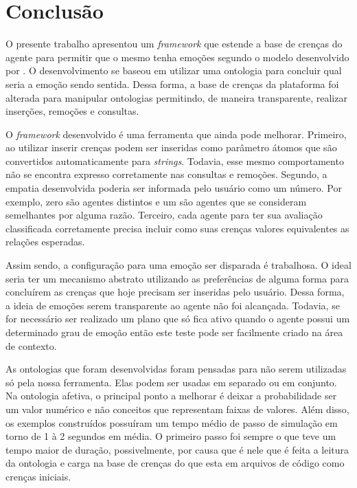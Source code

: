 \chapter{Conclusão} \label{ch:cf}

O presente trabalho apresentou um \emph{framework} que estende a base de
crenças do agente \jason para permitir que o mesmo tenha emoções segundo o
modelo desenvolvido por \citet{ortony1988cse}. O desenvolvimento se baseou em
utilizar uma ontologia para concluir qual seria a emoção sendo sentida. Dessa
forma, a base de crenças da plataforma foi alterada para manipular ontologias
permitindo, de maneira transparente, realizar inserções, remoções e consultas.

O \emph{framework} desenvolvido é uma ferramenta que ainda pode melhorar.
Primeiro, ao utilizar inserir crenças podem ser inseridas como parâmetro
átomos que são convertidos automaticamente para \emph{strings}. Todavia, esse
mesmo comportamento não se encontra expresso corretamente nas consultas e
remoções. Segundo, a empatia desenvolvida poderia ser informada pelo usuário
como um número. Por exemplo, zero são agentes distintos e um são agentes que
se consideram semelhantes por alguma razão. Terceiro, cada agente para ter sua
avaliação classificada corretamente precisa incluir como suas crenças valores
equivalentes as relações esperadas.

Assim sendo, a configuração para uma emoção ser disparada é trabalhosa. O
ideal seria ter um mecanismo abstrato utilizando as preferências de alguma
forma para concluírem as crenças que hoje precisam ser inseridas pelo usuário.
Dessa forma, a ideia de emoções serem transparente ao agente não foi
alcançada. Todavia, se for necessário ser realizado um plano que só fica
ativo quando o agente possui um determinado grau de emoção então este teste
pode ser facilmente criado na área de contexto.


As ontologias que foram desenvolvidas foram pensadas para não serem utilizadas
só pela nossa ferramenta. Elas podem ser usadas em separado ou em conjunto. Na
ontologia afetiva, o principal ponto a melhorar é deixar a probabilidade ser
um valor numérico e não conceitos que representam faixas de valores.
%
Além disso, os exemplos construídos possuíram um tempo médio de passo de
simulação em torno de 1 à 2 segundos em média. O primeiro passo foi sempre o
que teve um tempo maior de duração, possivelmente, por causa que é nele que é
feita a leitura da ontologia e carga na base de crenças do que esta em
arquivos de código \jason como crenças iniciais.


